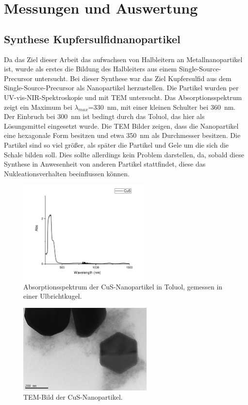 \section{Messungen und Auswertung}

\subsection{Synthese Kupfersulfidnanopartikel}
	Da das Ziel dieser Arbeit das aufwachsen von Halbleitern an Metallnanopartikel ist, wurde als erstes die Bildung des Halbleiters aus einem Single-Source-Precursor untersucht.
	Bei dieser Synthese war das Ziel Kupfersulfid aus dem Single-Source-Precursor  als Nanopartikel herzustellen. 
	Die Partikel wurden per UV-vis-NIR-Spektroskopie und mit TEM untersucht.
	Das Absorptionsspektrum zeigt ein Maximum bei $\lambda_{max}$=\SI{330}{\nano\meter}, mit einer kleinen Schulter bei \SI{360}{\nano\meter}.%
	Der Einbruch bei \SI{300}{\nano\meter} ist bedingt durch das Toluol, das hier als Lösungsmittel eingesetzt wurde.
	Die TEM Bilder zeigen, dass die Nanopartikel eine hexagonale Form besitzen und etwa \SI{350}{\nano\meter} als Durchmesser besitzen.
	Die Partikel sind so viel größer, als später die Partikel und Gele um die sich die Schale bilden soll.
	Dies sollte allerdings kein Problem darstellen, da, sobald diese Synthese in Anwesenheit von anderen Partikel stattfindet, diese das Nukleationsverhalten beeinflussen können.
	
	
	\begin{figure}[H]
		\centering
		\includegraphics[width=0.6\textwidth]{Bilder/UV-CuS} 	
		\caption{Absorptionsspektrum der CuS-Nanopartikel in Toluol, gemessen in einer Ulbrichtkugel.}
		\label{fig:UV-CuS}
	\end{figure}
	
	\begin{figure}[H]
		\centering
		\includegraphics[width=0.6\textwidth]{Bilder/TEM-CuS} 	
		\caption{TEM-Bild der CuS-Nanopartikel.}
		\label{fig:TEM-CuS}
	\end{figure}
	
